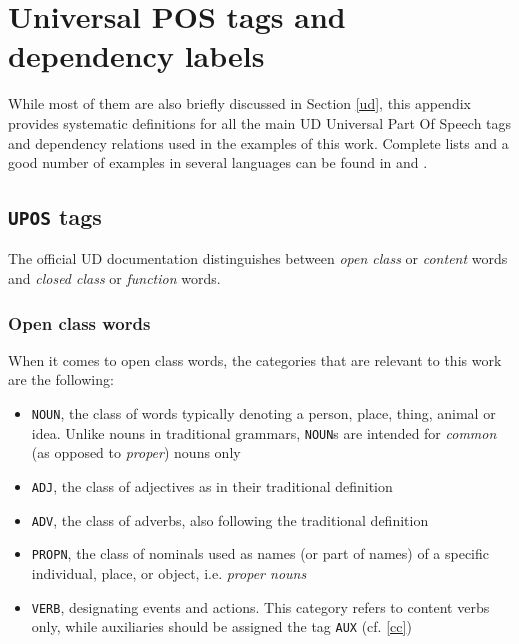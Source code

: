 \chapter{Universal POS tags and dependency labels} \label{a}
While most of them are also briefly discussed in Section \ref{ud}, this appendix provides systematic definitions for all the main UD Universal Part Of Speech tags and dependency relations used in the examples of this work. Complete lists and a good number of examples in several languages can be found in \cite{uddocs} and \cite{compsyn}.

\section{\texttt{UPOS} tags} \label{a_pos}
The official UD documentation \cite{uddocs} distinguishes between \textit{open class} or \textit{content} words and \textit{closed class} or \textit{function} words. 

\subsection{Open class words}
When it comes to open class words, the categories that are relevant to this work are the following:\smallskip
\begin{itemize}
    \item \texttt{NOUN}, the class of words typically denoting a person, place, thing, animal or idea. Unlike nouns in traditional grammars, \texttt{NOUN}s are intended for \textit{common} (as opposed to \textit{proper}) nouns only
    \item \texttt{ADJ}, the class of adjectives as in their traditional definition
    \item \texttt{ADV}, the class of adverbs, also following the traditional definition
    \item \texttt{PROPN}, the class of nominals used as names (or part of names) of a specific individual, place, or object, i.e. \textit{proper nouns}
    \item \texttt{VERB}, designating events and actions. This category refers to content verbs only, while auxiliaries should be assigned the tag \texttt{AUX} (cf. \ref{cc})
\end{itemize}


